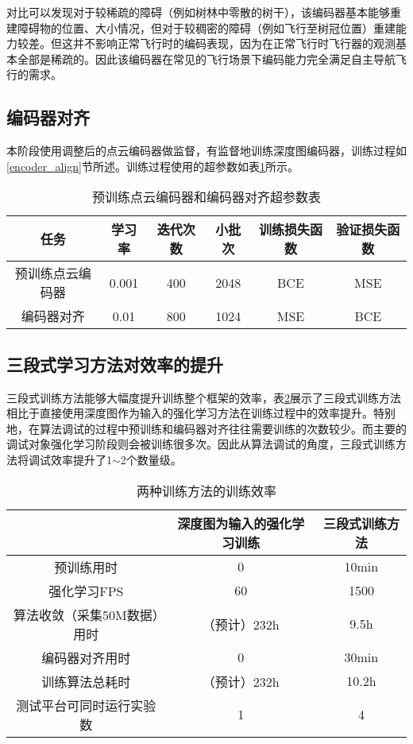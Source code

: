 对比可以发现对于较稀疏的障碍（例如树林中零散的树干），该编码器基本能够重建障碍物的位置、大小情况，但对于较稠密的障碍（例如飞行至树冠位置）重建能力较差。但这并不影响正常飞行时的编码表现，因为在正常飞行时飞行器的观测基本全部是稀疏的。因此该编码器在常见的飞行场景下编码能力完全满足自主导航飞行的需求。

\subsection{编码器对齐}

本阶段使用调整后的点云编码器做监督，有监督地训练深度图编码器，训练过程如\ref{encoder_align}节所述。训练过程使用的超参数如表\ref{encoder_param}所示。

\begin{table}
    \centering
    \begin{tabular}{cccccc}
    \hline
        任务 & 学习率 & 迭代次数 & 小批次 & 训练损失函数 & 验证损失函数 \\ \hline
        预训练点云编码器 & 0.001 & 400 & 2048 & BCE & MSE \\ 
        编码器对齐 & 0.01 & 800 & 1024 & MSE & BCE \\ \hline
    \end{tabular}
    \caption{预训练点云编码器和编码器对齐超参数表}
    \label{encoder_param}
\end{table}

\subsection{三段式学习方法对效率的提升}

三段式训练方法能够大幅度提升训练整个框架的效率，表\ref{simulation_eff}展示了三段式训练方法相比于直接使用深度图作为输入的强化学习方法在训练过程中的效率提升。特别地，在算法调试的过程中预训练和编码器对齐往往需要训练的次数较少。而主要的调试对象强化学习阶段则会被训练很多次。因此从算法调试的角度，三段式训练方法将调试效率提升了1$\sim$2个数量级。

\begin{table}
    \centering
    \begin{tabular}{ccc}
    \hline
        ~ &  深度图为输入的强化学习训练 & 三段式训练方法 \\ \hline
        预训练用时 & 0 & 10min \\ 
        强化学习FPS & 60 & 1500 \\ 
        算法收敛（采集50M数据）用时 & （预计）232h & 9.5h \\ 
        编码器对齐用时 & 0 & 30min \\ 
        训练算法总耗时 & （预计）232h & 10.2h \\ 
        测试平台可同时运行实验数 & 1 & 4 \\ \hline
    \end{tabular}
    \caption{两种训练方法的训练效率}
    \label{simulation_eff}
\end{table}

